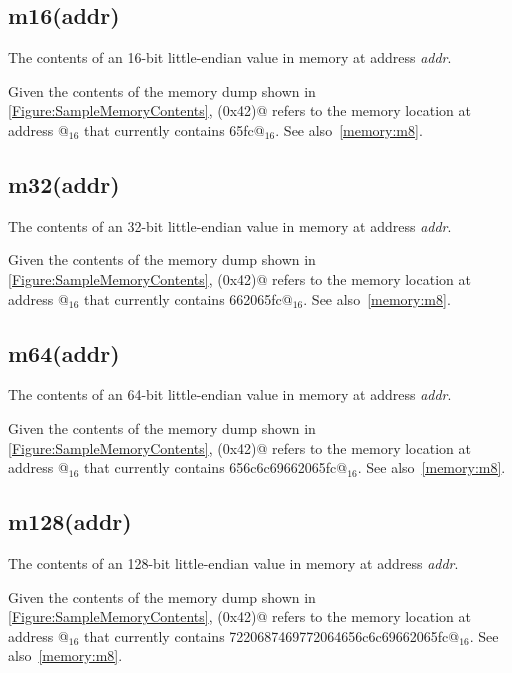 \subsection{m16(addr)}
\label{memory:m16}

The contents of an 16-bit little-endian value in memory at address {\em addr}.

Given the contents of the memory dump shown in 
\autoref{Figure:SampleMemoryContents}, 
(0x42)@ refers to the memory location at address @$_{16}$
that currently contains \verb@65fc@$_{16}$. See also~\autoref{memory:m8}.


\subsection{m32(addr)}
\label{memory:m32}

The contents of an 32-bit little-endian value in memory at address {\em addr}.

Given the contents of the memory dump shown in
\autoref{Figure:SampleMemoryContents},
(0x42)@ refers to the memory location at address @$_{16}$
that currently contains \verb@662065fc@$_{16}$.
See also~\autoref{memory:m8}.

\subsection{m64(addr)}

The contents of an 64-bit little-endian value in memory at address {\em addr}.

Given the contents of the memory dump shown in 
\autoref{Figure:SampleMemoryContents}, 
(0x42)@ refers to the memory location at address @$_{16}$
that currently contains \verb@656c6c69662065fc@$_{16}$.
See also~\autoref{memory:m8}.

\subsection{m128(addr)}

The contents of an 128-bit little-endian value in memory at 
address {\em addr}.

Given the contents of the memory dump shown in 
\autoref{Figure:SampleMemoryContents}, 
(0x42)@ refers to the memory location at address @$_{16}$
that currently contains \verb@7220687469772064656c6c69662065fc@$_{16}$.
See also~\autoref{memory:m8}.

